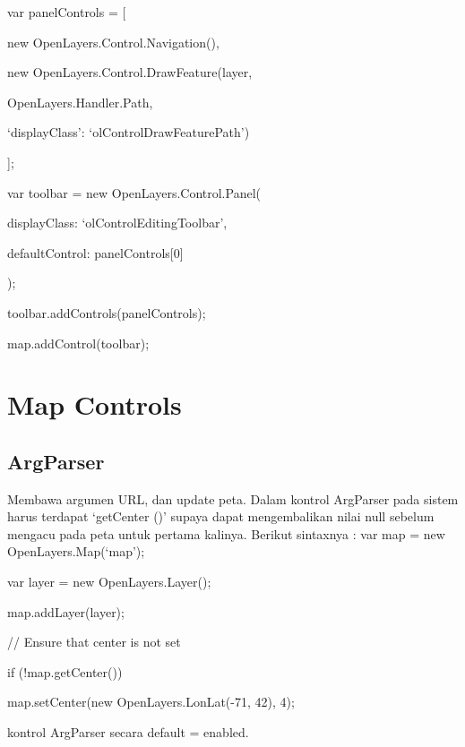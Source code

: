var panelControls = [

new OpenLayers.Control.Navigation(),

new OpenLayers.Control.DrawFeature(layer,

OpenLayers.Handler.Path,

{‘displayClass’: ‘olControlDrawFeaturePath’})

];

var toolbar = new OpenLayers.Control.Panel({

displayClass: ‘olControlEditingToolbar’,

defaultControl: panelControls[0]

});

toolbar.addControls(panelControls);

map.addControl(toolbar);


\section{Map Controls}
\subsection{ArgParser}
 
Membawa argumen URL, dan update peta.
Dalam kontrol ArgParser pada sistem harus terdapat ‘getCenter ()’ supaya dapat mengembalikan nilai null sebelum mengacu pada peta untuk pertama kalinya. 
Berikut sintaxnya :
var map = new OpenLayers.Map(‘map’);

var layer = new OpenLayers.Layer();

map.addLayer(layer);

// Ensure that center is not set

if (!map.getCenter()) {

map.setCenter(new OpenLayers.LonLat(-71, 42), 4);

}

kontrol ArgParser secara default = enabled.





